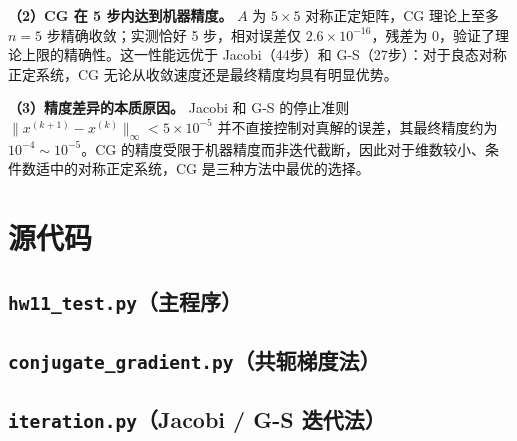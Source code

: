\documentclass[10pt, a4paper]{article}
\begin{document}
\textbf{（2）CG 在 5 步内达到机器精度。}
$A$ 为 $5\times5$ 对称正定矩阵，CG 理论上至多 $n=5$ 步精确收敛；实测恰好 5 步，相对误差仅 $2.6\times10^{-16}$，残差为 $0$，验证了理论上限的精确性。这一性能远优于 Jacobi（44步）和 G-S（27步）：对于良态对称正定系统，CG 无论从收敛速度还是最终精度均具有明显优势。

\textbf{（3）精度差异的本质原因。}
Jacobi 和 G-S 的停止准则 $\|x^{(k+1)}-x^{(k)}\|_\infty<5\times10^{-5}$ 并不直接控制对真解的误差，其最终精度约为 $10^{-4}\sim10^{-5}$。CG 的精度受限于机器精度而非迭代截断，因此对于维数较小、条件数适中的对称正定系统，CG 是三种方法中最优的选择。

\appendix
\section{源代码}

\subsection{\texttt{hw11\_test.py}（主程序）}


\subsection{\texttt{conjugate\_gradient.py}（共轭梯度法）}


\subsection{\texttt{iteration.py}（Jacobi / G-S 迭代法）}

\end{document}
